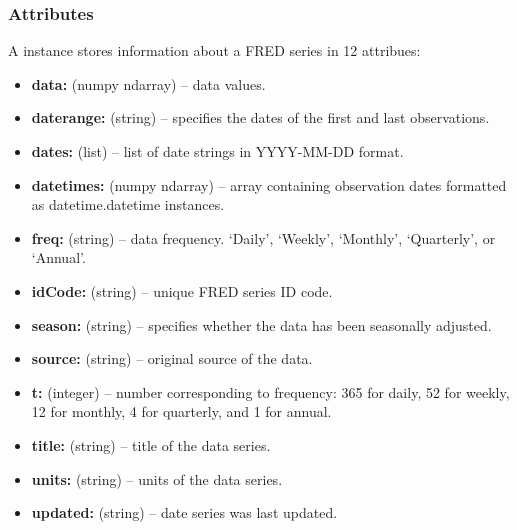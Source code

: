 \documentclass[letterpaper,10pt,openany,oneside]{sphinxmanual}
\begin{document}
\subsubsection{Attributes}
\label{fredpy_examples:Attributes}
A {\hyperref[series_class:fredpy.series]{}} instance stores information about a FRED series in 12 attribues:
\begin{itemize}
\item {} 
\textbf{data:}     (numpy ndarray) – data values.

\item {} 
\textbf{daterange:}        (string) – specifies the dates of the first and last observations.

\item {} 
\textbf{dates:}    (list) – list of date strings in YYYY-MM-DD format.

\item {} 
\textbf{datetimes:}        (numpy ndarray) – array containing observation dates formatted as datetime.datetime instances.

\item {} 
\textbf{freq:}     (string) – data frequency. ‘Daily’, ‘Weekly’, ‘Monthly’, ‘Quarterly’, or ‘Annual’.

\item {} 
\textbf{idCode:}   (string) – unique FRED series ID code.

\item {} 
\textbf{season:}   (string) – specifies whether the data has been seasonally adjusted.

\item {} 
\textbf{source:}   (string) – original source of the data.

\item {} 
\textbf{t:}        (integer) – number corresponding to frequency: 365 for daily, 52 for weekly, 12 for monthly, 4 for quarterly, and 1 for annual.

\item {} 
\textbf{title:}    (string) – title of the data series.

\item {} 
\textbf{units:}    (string) – units of the data series.

\item {} 
\textbf{updated:}  (string) – date series was last updated.

\end{itemize}
\end{document}
